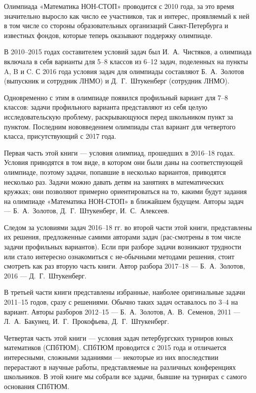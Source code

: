 \noindent\abz Олимпиада «Математика НОН-СТОП» проводится с 2010 года, за это время значительно выросло как число ее участников, так и интерес, проявляемый к ней в том числе со стороны образовательных организаций Санкт-Петербурга и известных фондов, которые теперь оказывают поддержку олимпиаде.

\aabz В 2010–2015 годах составителем условий задач был И.~А.~Чистяков, а олимпиада включала в себя варианты для 5–8 классов из 6–12 задач, поделенных на пункты A, B и C. С 2016 года условия задач для олимпиады составляют Б.~А.~Золотов (выпускник и сотрудник ЛНМО) и Д.~Г.~Штукенберг (сотрудник ЛНМО).

\aabz Одновременно с этим в олимпиаде появился профильный вариант для 7–8 классов: задачи профильного варианта представляют из себя целую исследовательскую проблему, раскрывающуюся перед школьником пункт за пунктом. Последним нововведением олимпиады стал вариант для четвертого класса, присутствующий с 2017 года.

\aabz Первая часть этой книги — условия олимпиад, прошедших в 2016–18 годах. Условия приводятся в том виде, в котором они были даны на соответствующей олимпиаде, поэтому задачи, попавшие в несколько вариантов, приводятся несколько раз. Задачи можно давать детям на занятиях в математических кружках; они позволяют примерно ориентироваться на то, какими будут задания на олимпиаде «Математика НОН-СТОП» в ближайшем будущем. Авторы задач — Б.~А.~Золотов, Д.~Г.~Штукенберг, И.~С.~Алексеев.

\aabz Следом за условиями задач 2016–18 гг. во второй части этой книги, представлены их решения, предложенные самими авторами задач (рас-\linebreak смотрены в том числе задачи профильных вариантов). Если при разборе задачи возникают трудности или стало интересно ознакомиться с не-\linebreak обычными методами решения, стоит смотреть как раз вторую часть книги. Автор разбора 2017–18 — Б.~А.~Золотов, 2016 — Д.~Г.~Штукенберг.

\aabz В третьей части книги представлены избранные, наиболее оригинальные задачи 2011–15 годов, сразу с решениями. Обычно таких задач оставалось по 3–4 на вариант. Авторы разборов 2012–15 — Б.~А.~Золотов, А.~В.~Семенов, 2011 — Л.~А.~Бакунец, И.~Г.~Прокофьева, Д.~Г.~Штукенберг.

\aabz Четвертая часть этой книги — условия задач петербургских турниров юных математиков (СПбТЮМ). СПбТЮМ проводится с 2015 года и отличается интересными, сложными заданиями — некоторые из них впоследствии перерастают в научные работы, представляемые на различных конференциях школьников. В этой книге мы собрали все задачи, бывшие на турнирах с самого основания СПбТЮМ.

